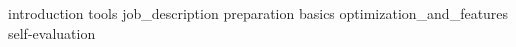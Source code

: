 \documentclass[crop=false]{standalone}
\begin{document}
  \tableofcontents
  \cleardoublepage

  {introduction}
  {tools}
  {job_description}
  {preparation}
  {basics}
  {optimization_and_features}
  {self-evaluation}
\end{document}
